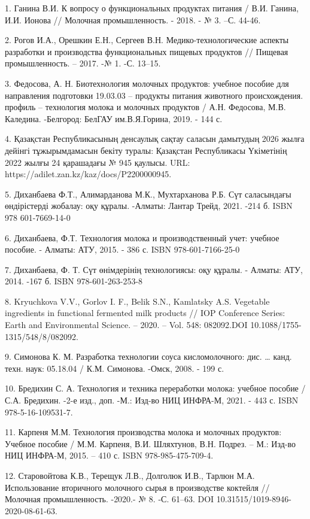 \begin{references}
1. Ганина В.И. К вопросу о функциональных продуктах питания / В.И.
Ганина, И.И. Ионова // Молочная промышленность. - 2018. - № 3. --С.
44-46.

2. Рогов И.А., Орешкин Е.Н., Сергеев В.Н. Медико-технологические аспекты
разработки и производства функциональных пищевых продуктов // Пищевая
промышленность. -- 2017. -№ 1. -С. 13--15.

3. Федосова, А. Н. Биотехнология молочных продуктов: учебное пособие для
направления подготовки 19.03.03 -- продукты питания животного
происхождения. профиль -- технология молока и молочных продуктов /
А.Н. Федосова, М.В. Каледина. -Белгород: БелГАУ им.В.Я.Горина, 2019. -
144 с.

4. Қазақстан Республикасының денсаулық сақтау саласын дамытудың 2026
жылға дейінгі тұжырымдамасын бекіту туралы: Қазақстан Республикасы
Үкіметінің 2022 жылғы 24 қарашадағы № 945 қаулысы. URL:
https://adilet.zan.kz/kaz/docs/P2200000945.

5. Диханбаева Ф.Т., Алимарданова М.К., Мухтарханова Р.Б. Сүт саласындағы
өндірістерді жобалау: оқу құралы. -Алматы: Лантар Трейд, 2021. -214 б.
ISBN 978 601-7669-14-0

6. Диханбаева, Ф.Т. Технология молока и производственный учет: учебное
пособие. - Алматы: АТУ, 2015. - 386 с. ISBN 978-601-7166-25-0

7. Диханбаева, Ф. Т. Сүт өнімдерінің технологиясы: оқу құралы. - Алматы:
АТУ, 2014. -167 б. ISBN 978-601-263-253-8

8. Kryuchkova V.V., Gorlov I. F., Belik S.N., Kamlatsky A.S. Vegetable
ingredients in functional fermented milk products // IOP Conference
Series: Earth and Environmental Science. -- 2020. -- Vol. 548:
082092.DOI 10.1088/1755-1315/548/8/082092.

9. Симонова К. М. Разработка технологии соуса кисломолочного: дис.
\ldots{} канд. техн. наук: 05.18.04 / К.М. Симонова. -Омск, 2008. -
199 с.

10. Бредихин С. А. Технология и техника переработки молока: учебное
пособие / С.А. Бредихин. -2-е изд., доп. -М.: Изд-во НИЦ ИНФРА-М,
2021. - 443 с. ISBN 978-5-16-109531-7.

11. Карпеня М.М. Технология производства молока и молочных продуктов:
Учебное пособие / М.М. Карпеня, В.И. Шляхтунов, В.Н. Подрез. -- М.:
Изд-во НИЦ ИНФРА-М, 2015. -- 410 с. ISBN 978-985-475-709-4.

12. Старовойтова К.В., Терещук Л.В., Долголюк И.В., Тарлюн М.А.
Использование вторичного молочного сырья в производстве коктейля //
Молочная промышленность. -2020.- № 8. -С. 61--63. DOI
10.31515/1019-8946-2020-08-61-63.


\end{references}
